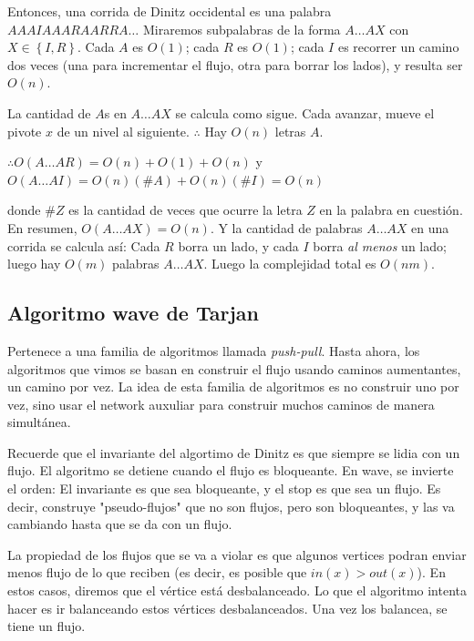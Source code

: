 \documentclass[a4paper]{article}
\begin{document}
Entonces, una corrida de Dinitz occidental es una palabra $A A A I A A A R A A
R R A \ldots$ Miraremos subpalabras de la forma $A \ldots A X$ con $X \in
\left\{ I, R \right\} $. Cada $A$ es $O(1)$; cada $R$ es $O(1)$; cada $I$ es
recorrer un camino dos veces (una para incrementar el flujo, otra para borrar
los lados), y resulta ser $O(n)$.

La cantidad de $A$s en $A \ldots A X$ se calcula como sigue. Cada avanzar, mueve
el pivote $x$ de un nivel al siguiente. $\therefore $ Hay $O(n)$ letras $A$. 

$\therefore O(A \ldots A R) = O(n) + O(1) + O(n)$ y $O(A \ldots AI) = O(n)(\#A) + O(n)(\#I) = O(n)$

donde $\#Z$ es la cantidad de veces que ocurre la letra $Z$ en la palabra en cuestión. En resumen, $O(A\ldots AX) = O(n)$. Y la cantidad de palabras $A \ldots AX$ en una corrida se calcula así: Cada $R$ borra un lado, y cada $I$ borra \textit{al menos} un lado; luego hay $O(m)$ palabras $A \ldots A X$. Luego la complejidad total es $O(nm)$.





\pagebreak

\subsection{Algoritmo wave de Tarjan}

Pertenece a una familia de algoritmos llamada \textit{push-pull}. Hasta ahora,
los algoritmos que vimos se basan en construir el flujo usando caminos
aumentantes, un camino por vez. La idea de esta familia de algoritmos es 
no construir uno por vez, sino usar el network auxuliar para construir 
muchos caminos de manera simultánea.

Recuerde que el invariante del algortimo de Dinitz es que siempre se lidia con
un flujo. El algoritmo se detiene cuando el flujo es bloqueante. En wave, se
invierte el orden: El invariante es que sea bloqueante, y el stop es que sea un
flujo. Es decir, construye "pseudo-flujos" que no son flujos, pero son
bloqueantes, y las va cambiando hasta que se da con un flujo.

La propiedad de los flujos que se va a violar es que algunos vertices podran
enviar menos flujo de lo que reciben (es decir, es posible que $in(x) >
out(x)$). En estos casos, diremos que el vértice está desbalanceado. Lo que el
algoritmo intenta hacer es ir balanceando estos vértices desbalanceados. Una
vez los balancea, se tiene un flujo.
\end{document}
